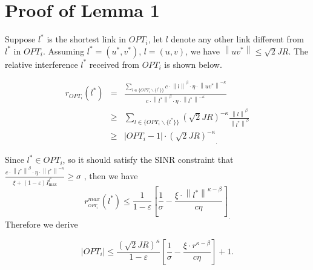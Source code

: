 \documentclass[journal]{IEEEtran}
\begin{document}
\section{Proof of Lemma 1}
\begin{IEEEproof}
Suppose $l^\ast $ is the shortest link in $OPT_{i}$,
let $l$ denote any other link different from $l^\ast $ in $OPT_{i}$.
Assuming $l^\ast =(u^\ast, v^\ast )$, $l=(u, v)$, we have
{\small{$ \left\| {{uv}^\ast } \right\| \le \sqrt 2 JR.$}}
The relative interference $l^\ast$ received from $OPT_{i}$ is
shown below.

\begin{eqnarray*}
 r_{OPT_{i}} (l^\ast )&=& \frac{\sum\limits_{l\in \{OPT_{i}\backslash
\{l^\ast \}\}} {c\cdot \left\| l \right\|^\beta \cdot \eta \cdot \left\|
{{uv}^\ast } \right\|^{-\kappa }} }{c\cdot \left\| {l^\ast }
\right\|^\beta \cdot \eta \cdot \left\| {l^\ast } \right\|^{-\kappa }} \\
&\ge& \sum\limits_{l\in \{OPT_{i}\backslash \{l^\ast \}\}} {(\sqrt 2
JR)^{-\kappa }} \frac{\left\| l \right\|^\beta }{\left\| {l^\ast }
\right\|^\beta }\\
&\ge&  {\left| {OPT_{i}-1} \right|\cdot (\sqrt 2 JR)^{-\kappa }}_.
 \end{eqnarray*}


Since $l^\ast \in OPT_{i} $, so it should satisfy the SINR constraint that {\small{$\frac{c\cdot \left\| {l^\ast } \right\|^\beta \cdot \eta \cdot
\left\| {l^\ast } \right\|^{-\kappa }}{\xi +(1-\varepsilon )I_{\max }^{l^*} }\ge
\sigma \mbox{ ,}$}}
then we have
\[r_{_{OPT_{i}} }^{max } (l^\ast )\le \frac{1}{1-\varepsilon
}\left[ {\frac{1}{\sigma }-\frac{\xi \cdot \left\| {l^\ast }
\right\|^{\kappa -\beta }}{c\eta }} \right]_. \]
Therefore we derive

\[ \left| {OPT_{i}} \right| \le  \frac{(\sqrt 2 JR)^\kappa }{1-\varepsilon
}\left[ {\frac{1}{\sigma }-\frac{\xi \cdot r^{\kappa -\beta}}{c\eta }} \right]+1.\]
\end{IEEEproof}
\end{document}
